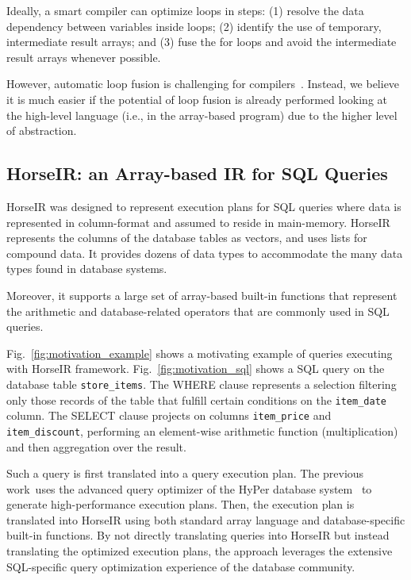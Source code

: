 
Ideally, a smart compiler can optimize loops in steps:
(1) resolve the data dependency between variables inside loops;
(2) identify the use of temporary, intermediate result arrays; and
(3) fuse the for loops and avoid the intermediate result arrays whenever possible.


However, automatic loop fusion is challenging for
compilers~\cite{Kennedy01:FastFusion,Kennedy1993:LoopFusion}.
Instead, we believe it is much easier if the potential of loop fusion is
already performed looking at the high-level language
(i.e., in the array-based program) due to the higher level of abstraction.

\subsection{HorseIR: an Array-based IR for SQL Queries}

HorseIR \OldPaper was designed to represent execution plans for SQL queries
where data is represented in column-format and assumed to reside in
main-memory. HorseIR represents the columns of the database tables as vectors,
and uses lists for compound data. It provides dozens of data types to
accommodate the many data types found in database systems. 

Moreover, it supports a large set of array-based built-in functions that
represent the arithmetic and database-related operators that are commonly used
in SQL queries.

Fig.~\ref{fig:motivation_example} shows a motivating example of queries
executing with HorseIR framework. Fig.~\ref{fig:motivation_sql} shows a SQL
query on the database table \texttt{store\_items}. The WHERE clause represents
a selection filtering only those records of the table that fulfill certain
conditions on the \texttt{item_date} column. The SELECT clause projects on
columns \texttt{item_price} and \texttt{item\_discount}, performing an
element-wise arithmetic function (multiplication) and then aggregation over the
result. 



Such a query is first translated into a query execution plan. The previous
work~\OldPaper uses the advanced query optimizer of the HyPer database
system~\cite{Neumann2011:HyPer} to generate high-performance execution plans.
Then, the execution plan is translated into HorseIR using both standard array
language and database-specific built-in functions. By not directly translating
queries into HorseIR but instead translating the optimized execution plans, the
approach leverages the extensive SQL-specific query optimization experience of
the database community.

